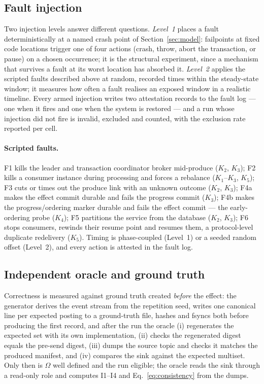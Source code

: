 \subsection{Fault injection}
\label{sec:method:injection}

Two injection levels answer different questions. \emph{Level~1} places a fault deterministically
at a named crash point of Section~\ref{sec:model}: failpoints at fixed code locations trigger one
of four actions (crash, throw, abort the transaction, or pause) on a chosen occurrence; it is the
structural experiment, since a mechanism that survives a fault at its worst location has absorbed
it. \emph{Level~2} applies the scripted faults described above at random, recorded
times within the steady-state window; it measures how often a fault realises an exposed window in
a realistic timeline. Every armed injection writes two attestation records to the fault log ---
one when it fires and one when the system is restored --- and a run whose injection did not fire
is invalid, excluded and counted, with the exclusion rate reported per cell.

\paragraph{Scripted faults.} F1 kills the leader and transaction coordinator broker mid-produce
($K_2$, $K_3$); F2 kills a consumer instance during processing and forces a rebalance
($K_1$--$K_3$, $K_5$); F3 cuts or times out the produce link with an unknown outcome ($K_2$,
$K_3$); F4a makes the effect commit durable and fails the progress commit ($K_3$); F4b makes the
progress/ordering marker durable and fails the effect commit --- the early-ordering probe
($K_4$); F5 partitions the service from the database ($K_2$, $K_3$); F6 stops consumers, rewinds
their resume point and resumes them, a protocol-level duplicate redelivery ($K_5$). Timing is
phase-coupled (Level~1) or a seeded random offset (Level~2), and every action is attested in the
fault log.

\subsection{Independent oracle and ground truth}
\label{sec:method:oracle}

Correctness is measured against ground truth created \emph{before} the effect: the generator
derives the event stream from the repetition seed, writes one canonical line per expected posting
to a ground-truth file, hashes and fsyncs both before producing the first record, and after the
run the oracle (i) regenerates the expected set with its own implementation, (ii) checks the
regenerated digest equals the pre-send digest, (iii) dumps the source topic and checks it matches
the produced manifest, and (iv) compares the sink against the expected multiset. Only then is
$\Omega$ well defined and the run eligible; the oracle reads the sink through a read-only role and
computes I1--I4 and Eq.~\eqref{eq:consistency} from the dumps.

